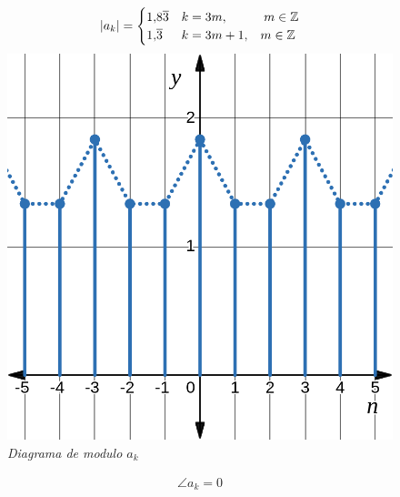 \documentclass[a4paper,12pt]{report}
\begin{document}
\begin{enumerate}[label=\alph*), left=0pt]
    \begin{figure}[H]
      \centering
      \noindent
      \begin{minipage}{0.4\textwidth}
        \centering
        \begin{align*}
          |a_k| =
          \begin{cases}
            1{,}8\overline{3} &k = 3m, \hspace{1cm} m \in \mathbb{Z}\\
            1{,}\overline{3} &k = 3m+1, \hspace{3mm} m \in \mathbb{Z}
          \end{cases}
        \end{align*}
        \includegraphics[width=1\textwidth]{./images/ej5.1.png}
        \textit{Diagrama de modulo $a_k$}
      \end{minipage}
      \hspace{1cm}
      \begin{minipage}{0.4\textwidth}
        \centering
        \begin{align*}
          \angle a_k = 0\\
        \end{align*}

\end{minipage}
\end{figure}
\end{enumerate}
\end{document}
